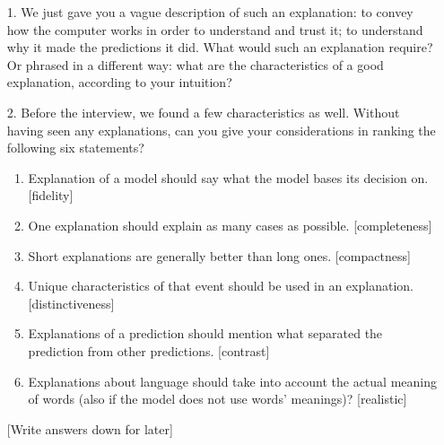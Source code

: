 \documentclass{article}
\theoremstyle{definition}
\theoremstyle{remark}
\begin{document}
\begin{enumerate}
    \item[1.] We just gave you a vague description of such an explanation: to convey how the computer works in order to understand and trust it; to understand why it made the predictions it did. What would such an explanation require? Or phrased in a different way: what are the characteristics of a good explanation, according to your intuition?

    \item[2.] Before the interview, we found a few characteristics as well. Without having seen any explanations, can you give your considerations in ranking the following six statements? \begin{enumerate}
        \item Explanation of a model should say what the model bases its decision on. [fidelity]
        \item One explanation should explain as many cases as possible. [completeness]
        \item Short explanations are generally better than long ones. [compactness]
        \item Unique characteristics of that event should be used in an explanation. [distinctiveness]
        \item Explanations of a prediction should mention what separated the prediction from other predictions. [contrast]
        \item Explanations about language should take into account the actual meaning of words (also if the model does not use words' meanings)? [realistic]
    \end{enumerate}

    [Write answers down for later]
\end{enumerate}


\\\\
\end{document}

